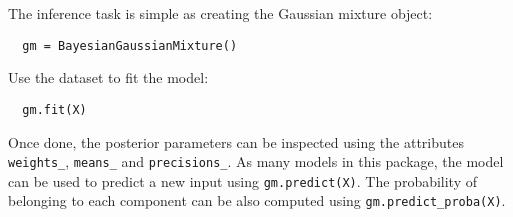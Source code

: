 The inference task is simple as creating the Gaussian mixture object:
\begin{verbatim}
  gm = BayesianGaussianMixture()
\end{verbatim}
Use the dataset to fit the model:
\begin{verbatim}
  gm.fit(X)
\end{verbatim}

Once done, the posterior parameters can be inspected using the attributes \texttt{weights\_}, \texttt{means\_} and \texttt{precisions\_}. As many models in this package, the model can be used to predict a new input using \texttt{gm.predict(X)}. The probability of belonging to each component can be also computed using \texttt{gm.predict\_proba(X)}.
